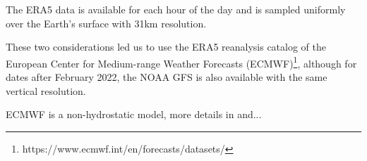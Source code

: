 \documentclass[twocolumn]{aastex631}
\begin{document}
The ERA5 data is available for each hour of the day and is sampled uniformly over the Earth's surface with 31km resolution. 

These two considerations led us to use the ERA5 reanalysis catalog of the European Center for Medium-range Weather Forecasts (ECMWF)\footnote{https://www.ecmwf.int/en/forecasts/datasets/}, although for dates after February 2022, the NOAA GFS is also available with the same vertical resolution.

ECMWF is a non-hydrostatic model, more details in \cite{osborn_atmospheric_2018} and...


{}



\end{document}

